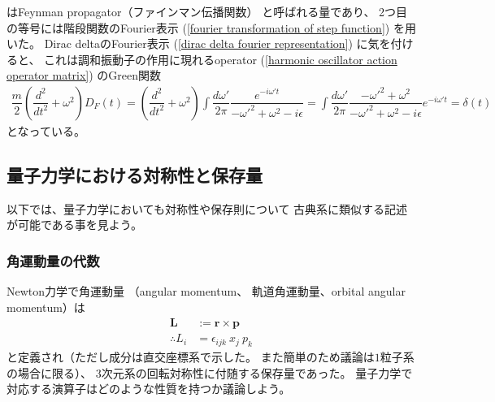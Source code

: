 はFeynman propagator（ファインマン伝播関数）
と呼ばれる量であり、
2つ目の等号には階段関数のFourier表示
(\ref{fourier transformation of step function})
を用いた。
Dirac deltaのFourier表示
(\ref{dirac delta fourier representation})
に気を付けると、
これは調和振動子の作用に現れるoperator
(\ref{harmonic oscillator action operator matrix})
のGreen関数
\begin{align}
    \dfrac{m}{2}
    \left(
        \dfrac{d^2}{dt^2}
        +
        \omega^2
    \right)
    D_F (t)
=
    \left(
        \dfrac{d^2}{dt^2}
        +
        \omega^2
    \right)
    \int
        \dfrac{d \omega'}{2 \pi}
        \dfrac{
            e^{ - i \omega' t }
        }{- \omega'^2 + \omega^2 - i \epsilon}
=
    \int
        \dfrac{d \omega'}{2 \pi}
        \dfrac{
        -
            \omega'^2
        +
            \omega^2
        }{- \omega'^2 + \omega^2 - i \epsilon}
        e^{ - i \omega' t }
= 
    \delta (t)
\end{align}
となっている。

\subsection{量子力学における対称性と保存量}

以下では、量子力学においても対称性や保存則について
古典系に類似する記述が可能である事を見よう。

\subsubsection{角運動量の代数}
\label{subsubsec: angular momentum}

Newton力学で角運動量
（angular momentum、
軌道角運動量、orbital angular momentum）は
\begin{subequations}
\begin{align}
    \bm{L} &:= \bm{r} \times \bm{p}
    \\\therefore
    L_i &= \epsilon_{ijk} \ x_j \ p_k
\label{angular momentum definition}
\end{align}
\end{subequations}
と定義され（ただし成分は直交座標系で示した。
また簡単のため議論は$1$粒子系の場合に限る）、
3次元系の回転対称性に付随する保存量であった。
量子力学で対応する演算子はどのような性質を持つか議論しよう。

